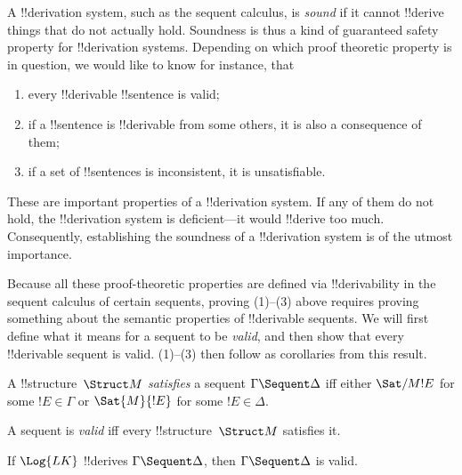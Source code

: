 \documentclass[../../../include/open-logic-section]{subfiles}
\begin{document}

\begin{explain}
A !!{derivation} system, such as the sequent calculus, is \emph{sound}
if it cannot !!{derive} things that do not actually hold.  Soundness is
thus a kind of guaranteed safety property for !!{derivation} systems.
Depending on which proof theoretic property is in question, we would
like to know for instance, that
\begin{enumerate}
\item every !!{derivable} !!{sentence} is valid;
\item if a !!{sentence} is !!{derivable} from some others, it is also a
  consequence of them;
\item if a set of !!{sentence}s is inconsistent, it is unsatisfiable.
\end{enumerate}
These are important properties of a !!{derivation} system.  If any of them do
not hold, the !!{derivation} system is deficient---it would !!{derive} too much.
Consequently, establishing the soundness of a !!{derivation} system is of the
utmost importance.

Because all these proof-theoretic properties are
defined via !!{derivability} in the sequent calculus of certain sequents,
proving (1)--(3) above requires proving something about the semantic
properties of !!{derivable} sequents.  We will first define what it means
for a sequent to be \emph{valid}, and then show that every !!{derivable}
sequent is valid.  (1)--(3) then follow as corollaries from this
result.
\end{explain}

\begin{defn}
A !!{structure}~$\Struct M$ \emph{satisfies} a sequent $\Gamma
\Sequent \Delta$ iff either $\Sat/{M}{!E}$ for some $!E
\in \Gamma$ or $\Sat{M}{!E}$ for some $!E \in \Delta$.

A sequent is \emph{valid} iff every !!{structure}~$\Struct M$
satisfies it.
\end{defn}

\begin{thm}[Soundness]
 If $\Log{LK}$ !!{derive}s $\Gamma \Sequent
\Delta$, then $\Gamma \Sequent \Delta$ is valid.
\end{thm}
\end{document}
